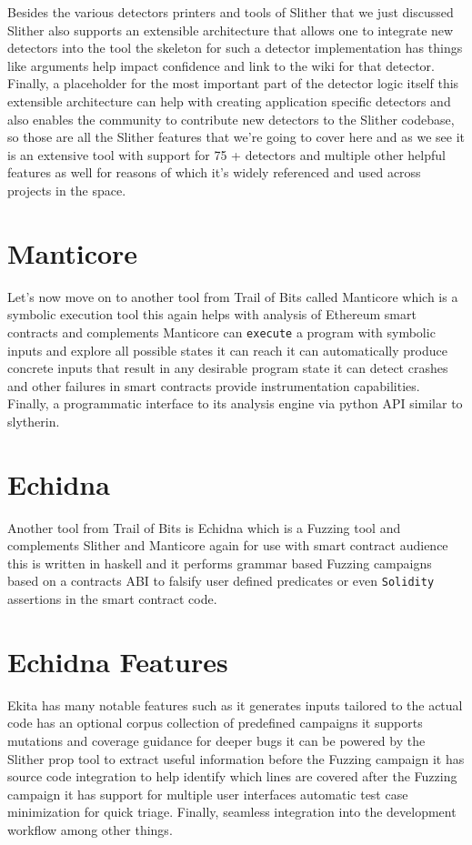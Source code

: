 Besides the various detectors printers and tools of Slither that we just discussed Slither also supports an extensible architecture that allows one to integrate new detectors into the tool the skeleton for such a detector implementation has things like arguments help impact confidence and link to the wiki for that detector. Finally, a placeholder for the most important part of the detector logic itself this extensible architecture can help with creating application specific detectors and also enables the community to contribute new detectors to the Slither codebase, so those are all the Slither features that we're going to cover here and as we see it is an extensive tool with support for 75 + detectors and multiple other helpful features as well for reasons of which it's widely referenced and used across projects in the space.

\section{Manticore}

Let's now move on to another tool from Trail of Bits called Manticore which is a symbolic execution tool this again helps with analysis of Ethereum smart contracts and complements Manticore can \verb|execute| a program with symbolic inputs and explore all possible states it can reach it can automatically produce concrete inputs that result in any desirable program state it can detect crashes and other failures in smart contracts provide instrumentation capabilities. Finally, a programmatic interface to its analysis engine via python API similar to slytherin.

\section{Echidna}

Another tool from Trail of Bits is Echidna which is a Fuzzing tool and complements Slither and Manticore again for use with smart contract audience this is written in haskell and it performs grammar based Fuzzing campaigns based on a contracts ABI to falsify user defined predicates or even \verb|Solidity| assertions in the smart contract code.

\section{Echidna Features}

Ekita has many notable features such as it generates inputs tailored to the actual code has an optional corpus collection of predefined campaigns it supports mutations and coverage guidance for deeper bugs it can be powered by the Slither prop tool to extract useful information before the Fuzzing campaign it has source code integration to help identify which lines are covered after the Fuzzing campaign it has support for multiple user interfaces automatic test case minimization for quick triage. Finally, seamless integration into the development workflow among other things.

